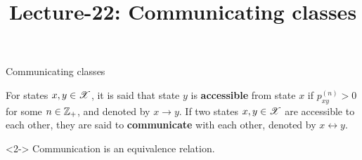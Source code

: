 \documentclass[12pt,aspectratio=169]{beamer}
\title{ Lecture-22: Communicating classes}
\date{}
\begin{document}
\pagestyle{empty}
\maketitle

\begin{frame}{Communicating classes}
\begin{Definition}
For states $x, y \in \mathscr{X}$, 
it is said that state $y$ is \textbf{accessible} from state $x$ if $p_{xy}^{(n)} > 0$ for some $n \in \mathbb{Z}_+$, and denoted by $x \to y$. 
If two states $x,y \in \mathscr{X}$ are accessible to each other, they are said to \textbf{communicate} with each other, denoted by $x \leftrightarrow y$. 
\end{Definition}
\begin{prop}<2->
Communication is an equivalence relation. 
\end{prop}
\end{frame}
\end{document}

